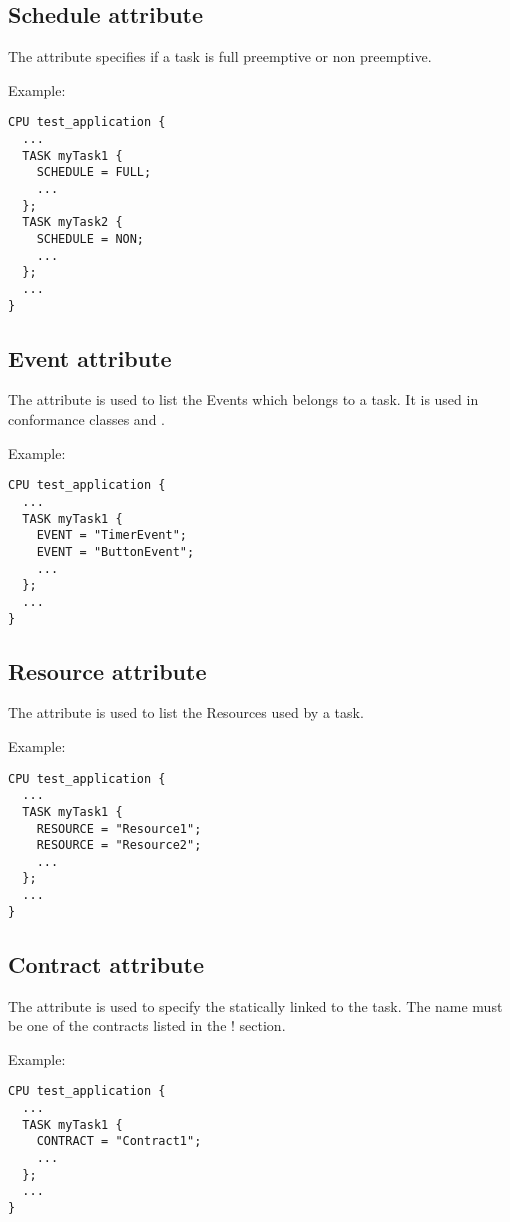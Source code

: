 \subsection{Schedule attribute}
The  attribute specifies if a task is full preemptive or non preemptive.

Example:

\begin{lstlisting}
CPU test_application {
  ...
  TASK myTask1 {
    SCHEDULE = FULL;
    ...
  };
  TASK myTask2 {
    SCHEDULE = NON;
    ...
  };
  ...
}
\end{lstlisting}

\subsection{Event attribute}
The  attribute is used to list the Events which belongs to
a task. It is used in conformance classes  and
.

Example:

\begin{lstlisting}
CPU test_application {
  ...
  TASK myTask1 {
    EVENT = "TimerEvent";
    EVENT = "ButtonEvent";
    ...
  };
  ...
}
\end{lstlisting}

\subsection{Resource attribute}
The  attribute is used to list the
Resources used by a task.

Example:

\begin{lstlisting}
CPU test_application {
  ...
  TASK myTask1 {
    RESOURCE = "Resource1";
    RESOURCE = "Resource2";
    ...
  };
  ...
}
\end{lstlisting}


\subsection{Contract attribute}
The  attribute is used to specify the  statically linked to the task. The  name must be one of the contracts listed in the  ! section.

Example:

\begin{lstlisting}
CPU test_application {
  ...
  TASK myTask1 {
    CONTRACT = "Contract1";
    ...
  };
  ...
}
\end{lstlisting}

